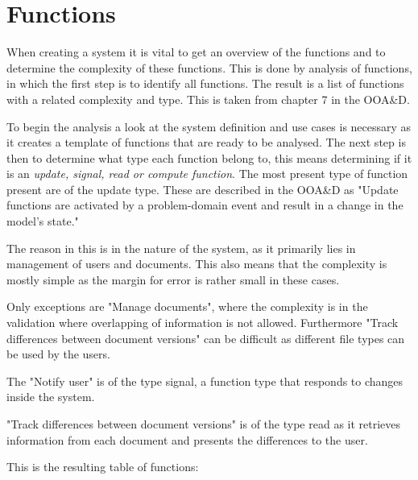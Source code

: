 \section{Functions}
When creating a system it is vital to get an overview of the functions and to determine the complexity of these functions. This is done by analysis of functions, in which the first step is to identify all functions. The result is a list of functions with a related complexity and type. This is taken from chapter 7 in the OOA\&D.\citep[ch.~7]{Rod-Aalborg}

To begin the analysis a look at the system definition and use cases is necessary as it creates a template of functions that are ready to be analysed. The next step is then to determine what type each function belong to, this means determining if it is an \textit{update, signal, read or compute function}. The most present type of function present are of the update type. These are described in the OOA\&D as "Update functions are activated by a problem-domain event and result in a change in the model's state."\citep[p.~140]{Rod-Aalborg}

The reason in this is in the nature of the system, as it primarily lies in management of users and documents. This also means that the complexity is mostly simple as the margin for error is rather small in these cases. 

Only exceptions are "Manage documents", where the complexity is in the validation where overlapping of information is not allowed. Furthermore "Track differences between document versions" can be difficult as different file types can be used by the users.

The "Notify user" is of the type signal, a function type that responds to changes inside the system.

"Track differences between document versions" is of the type read as it retrieves information from each document and presents the differences to the user.

This is the resulting table of functions:

